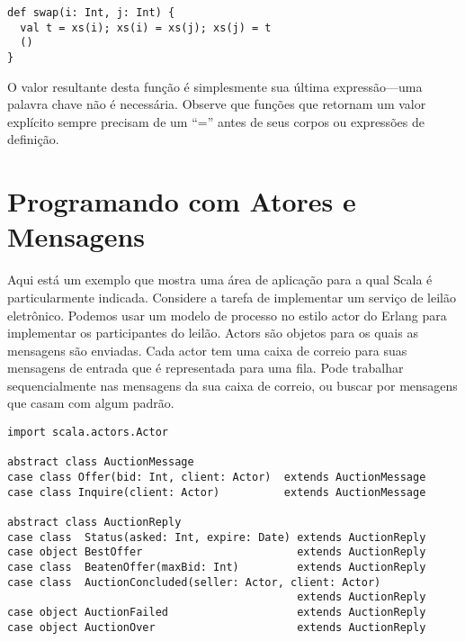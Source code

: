 \begin{lstlisting}
def swap(i: Int, j: Int) {
  val t = xs(i); xs(i) = xs(j); xs(j) = t
  ()
}
\end{lstlisting}

O valor resultante desta fun\c{c}\~{a}o \'{e} simplesmente sua \'{u}ltima express\~{a}o---uma
palavra chave \lstinline@return@ n\~{a}o \'{e} necess\'{a}ria. Observe que fun\c{c}\~{o}es 
que retornam um valor expl\'{i}cito sempre precisam de um ``='' antes de
seus corpos ou express\~{o}es de defini\c{c}\~{a}o.

\chapter{Programando com Atores e Mensagens}
\label{chap:example-auction}
Aqui est\'{a} um exemplo que mostra uma \'{a}rea de aplica\c{c}\~{a}o para a qual Scala 
\'{e} particularmente indicada. Considere a tarefa de implementar um servi\c{c}o
de leil\~{a}o eletr\^{o}nico. Podemos usar um modelo de processo no estilo 
actor do Erlang para implementar os participantes do leil\~{a}o. Actors s\~{a}o 
objetos para os quais as mensagens s\~{a}o enviadas. Cada actor tem uma caixa de correio 
para suas mensagens de entrada que \'{e} representada para uma fila. Pode
trabalhar sequencialmente nas mensagens da sua caixa de correio, ou buscar 
por mensagens que casam com algum padr\~{a}o. 
\begin{lstlisting}[style=floating,label=fig:simple-auction-msgs,caption=Message
    Classes for an Auction Service]
import scala.actors.Actor

abstract class AuctionMessage
case class Offer(bid: Int, client: Actor)  extends AuctionMessage
case class Inquire(client: Actor)          extends AuctionMessage

abstract class AuctionReply
case class  Status(asked: Int, expire: Date) extends AuctionReply
case object BestOffer                        extends AuctionReply
case class  BeatenOffer(maxBid: Int)         extends AuctionReply
case class  AuctionConcluded(seller: Actor, client: Actor) 
                                             extends AuctionReply
case object AuctionFailed                    extends AuctionReply
case object AuctionOver                      extends AuctionReply
\end{lstlisting}
